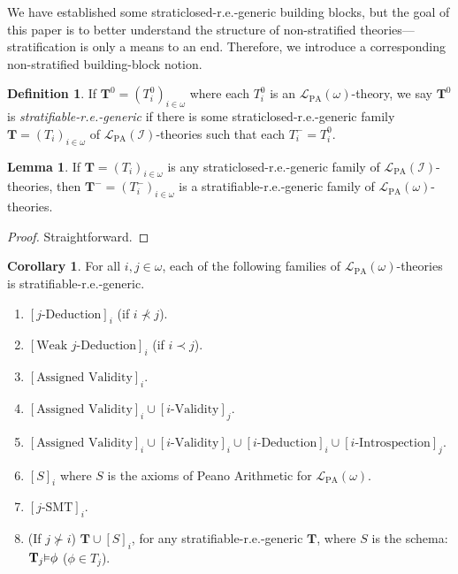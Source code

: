 \documentclass[reqno]{article}
\theoremstyle{definition}
\newtheorem{lemma}[theorem]{Lemma}
\newtheorem{corollary}[theorem]{Corollary}
\newtheorem{definition}[theorem]{Definition}
\def\L{\mathscr{L}}
\def\T{\mathbf{T}}
\def\LPA{\L_{\mathrm{PA}}}
\def\indset{\mathcal I}
\renewcommand{\Pr}[1]{\T_{#1}\mbox{\small${\vDash}$}}
\begin{document}
We have established some straticlosed-r.e.-generic building blocks, but
the goal of this paper is to better understand the structure of non-stratified
theories---stratification is only a means to an end.
Therefore, we introduce a corresponding non-stratified building-block notion.

\begin{definition}
If $\T^0=(T^0_i)_{i\in\omega}$ where each $T^0_i$ is an $\LPA(\omega)$-theory,
we say $\T^0$ is \emph{stratifiable-r.e.-generic} if there is
some straticlosed-r.e.-generic family $\T=(T_i)_{i\in\omega}$ of
$\LPA(\indset)$-theories such that
each $T^-_i=T^0_i$.
\end{definition}

\begin{lemma}
\label{trivialsourceofstratifiableregenericfamilies}
If $\T=(T_i)_{i\in\omega}$ is any straticlosed-r.e.-generic family of
$\LPA(\indset)$-theories,
then $\T^-=(T^-_i)_{i\in\omega}$ is a stratifiable-r.e.-generic family of
$\LPA(\omega)$-theories.
\end{lemma}

\begin{proof}
    Straightforward.
\end{proof}

\begin{corollary}
\label{stratifiableregenericsummary}
For all $i,j\in\omega$, each of the following families of $\LPA(\omega)$-theories
is stratifiable-r.e.-generic.
\begin{enumerate}
    \item $[\mbox{$j$-Deduction}]_i$ (if $i\not\prec j$).
    \item $[\mbox{Weak $j$-Deduction}]_i$ (if $i\prec j$).
    \item $[\mbox{Assigned Validity}]_i$.
    \item $[\mbox{Assigned Validity}]_i \cup [\mbox{$i$-Validity}]_j$.
    \item $[\mbox{Assigned Validity}]_i
        \cup [\mbox{$i$-Validity}]_i
        \cup [\mbox{$i$-Deduction}]_i
        \cup [\mbox{$i$-Introspection}]_j$.
    \item $[S]_i$ where $S$ is the axioms of Peano Arithmetic for $\LPA(\omega)$.
    \item $[\mbox{$j$-SMT}]_i$.
    \item (If $j\not\succ i$) $\T\cup [S]_i$, for any stratifiable-r.e.-generic $\T$,
    where $S$ is the schema: $\Pr j\phi$ ($\phi\in T_j$).
\end{enumerate}
\end{corollary}
\end{document}
